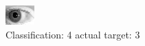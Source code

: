 \begin{figure}[h!]
\begin{center}
\includegraphics[width=0.60\columnwidth]{figures/ID334_class_4_target_3.png}
\end{center}
\caption{ Classification: 4 actual target: 3}
\label{fig:ID334_class_4_target_3}
\end{figure}
